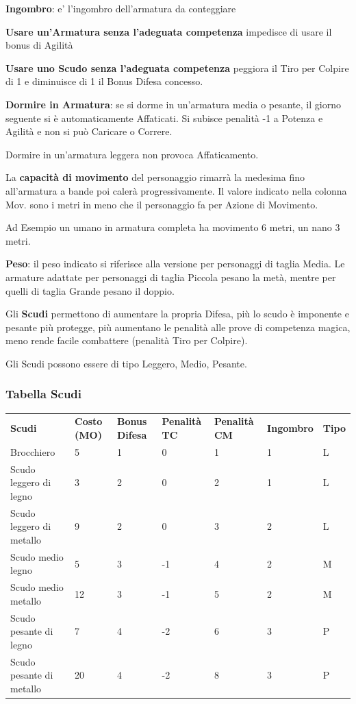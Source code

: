 \documentclass[a4paper,11pt,twoside,openany]{book}
\begin{document}
\textbf{Ingombro}: e' l'ingombro dell'armatura da conteggiare

\bigskip

\textbf{Usare un'Armatura senza l'adeguata competenza} impedisce di usare il bonus di Agilità

\textbf{Usare uno Scudo senza l'adeguata competenza} peggiora il Tiro per Colpire di 1 e diminuisce di 1 il Bonus Difesa concesso.

\textbf{Dormire in Armatura}: se si dorme in un'armatura media o pesante, il giorno seguente si è automaticamente Affaticati. Si subisce penalità -1 a Potenza e Agilità e non si può Caricare o Correre.

Dormire in un'armatura leggera non provoca Affaticamento.

La \textbf{capacità di movimento} del personaggio rimarrà la medesima fino all'armatura a bande poi calerà progressivamente. Il valore indicato nella colonna Mov. sono i metri in meno che il personaggio fa per Azione di Movimento.

Ad Esempio un umano in armatura completa ha movimento 6 metri, un nano 3 metri.

\textbf{Peso}: il peso indicato si riferisce alla versione per personaggi di taglia Media. Le armature adattate per personaggi di taglia Piccola pesano la metà, mentre per quelli di taglia Grande pesano il doppio.

\pagebreak

Gli \textbf{Scudi} permettono di aumentare la propria Difesa, più lo scudo è imponente e pesante più protegge, più aumentano le penalità alle prove di competenza magica, meno rende facile combattere (penalità Tiro per Colpire).

Gli Scudi possono essere di tipo Leggero, Medio, Pesante.

\subsubsection{Tabella Scudi}

\label{tabella-scudi}
\medskip
\begin{tabular}{lllllll}
	\toprule
	\textbf{Scudi} & \textbf{Costo (MO)} & \textbf{Bonus Difesa} & \textbf{Penalità TC} & \textbf{Penalità CM} & \textbf{Ingombro} & \textbf{Tipo}\\
	Brocchiero& 5    & 1 & 0& 1& 1  & L\\
	Scudo leggero di legno   & 3    & 2 & 0& 2& 1  & L\\
	Scudo leggero di metallo & 9    & 2 & 0& 3& 2  & L\\
	Scudo medio legno   & 5    & 3 & -1    & 4& 2  & M\\
	Scudo medio metallo & 12   & 3 & -1    & 5& 2  & M\\
	Scudo pesante di legno   & 7    & 4 & -2    & 6& 3  & P\\
	Scudo pesante di metallo & 20   & 4 & -2    & 8& 3  & P\\
\end{tabular}
\end{document}
